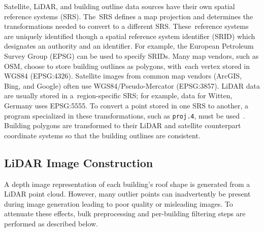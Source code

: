 Satellite, LiDAR, and building outline data sources have their own spatial reference systems (SRS). The~SRS defines a map projection and determines the transformations needed to convert to a different SRS.  These~reference systems are uniquely identified though a spatial reference system identifier (SRID) which designates an authority and an identifier.  For example, the  European Petroleum Survey Group (EPSG) can be used to specify SRIDs. Many map vendors, such as OSM, choose to store building outlines as polygons, with~each vertex stored in WGS84 (EPSG:4326). Satellite images from common map vendors (ArcGIS, Bing, and Google) often use WGS84/Pseudo-Mercator (EPSG:3857). LiDAR data are usually stored in a~region-specific SRS; for example, data for Witten, Germany uses EPSG:5555. To convert a point stored in one SRS to another, a program specialized in these transformations, such as \texttt{proj.4}, must be used~\cite{proj_contributors_proj_2018}.  Building polygons are transformed to their LiDAR and satellite counterpart coordinate systems so that the building outlines are consistent.


\subsection{LiDAR Image Construction}\label{sec:lidar_construction}
A depth image representation of each building's roof shape is generated from a LiDAR point cloud.  However, many outlier points can inadvertently be present during  image generation leading to poor quality or misleading images.  To attenuate these effects, bulk preprocessing and per-building filtering steps are performed as described below.%

